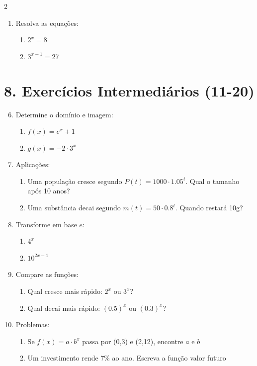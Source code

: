 \documentclass[11pt]{article}
\begin{document}
\begin{multicols}{2}
\begin{enumerate}
    \item Resolva as equações:
    \begin{enumerate}[label=\alph*)]
        \item $2^x = 8$
        \item $3^{x-1} = 27$
    \end{enumerate}
\end{enumerate}

\section*{8. Exercícios Intermediários (11-20)}
\begin{enumerate}\setcounter{enumi}{5}
    \item Determine o domínio e imagem:
    \begin{enumerate}[label=\alph*)]
        \item $f(x) = e^x + 1$
        \item $g(x) = -2 \cdot 3^x$
    \end{enumerate}
    
    \item Aplicações:
    \begin{enumerate}[label=\alph*)]
        \item Uma população cresce segundo $P(t) = 1000 \cdot 1.05^t$. Qual o tamanho após 10 anos?
        \item Uma substância decai segundo $m(t) = 50 \cdot 0.8^t$. Quando restará 10g?
    \end{enumerate}
    
    \item Transforme em base $e$:
    \begin{enumerate}[label=\alph*)]
        \item $4^x$
        \item $10^{2x-1}$
    \end{enumerate}
    
    \item Compare as funções:
    \begin{enumerate}[label=\alph*)]
        \item Qual cresce mais rápido: $2^x$ ou $3^x$?
        \item Qual decai mais rápido: $(0.5)^x$ ou $(0.3)^x$?
    \end{enumerate}
    
    \item Problemas:
    \begin{enumerate}[label=\alph*)]
        \item Se $f(x) = a \cdot b^x$ passa por (0,3) e (2,12), encontre $a$ e $b$
        \item Um investimento rende 7\% ao ano. Escreva a função valor futuro
    \end{enumerate}
\end{enumerate}


\end{multicols}
\end{document}
